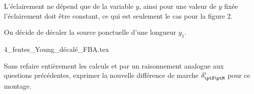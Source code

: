 	
	\begin{corrige}
		L'éclairement ne dépend que de la variable $y$, ainsi pour une valeur de $y$ fixée l'éclairement doit être constant, ce qui est seulement le cas pour la figure 2.
	\end{corrige}
	

\pauseEntrainement

                                \initialisationPartieGauche %
On décide de décaler la source ponctuelle d'une longueur $y_1$.
\initialisationPartieDroite %
\begin{center}
	{4_fentes_Young_décalé_FBA.tex}
\end{center}
                               \finalisationDuPartageDePage %
\repriseEntrainement

\begin{enonce}
		Sans refaire entièrement les calculs et par un raisonnement analogue aux questions précédentes, exprimer la nouvelle différence de marche $\delta'_{\ptS \ptM}$ pour ce montage.
\end{enonce}

